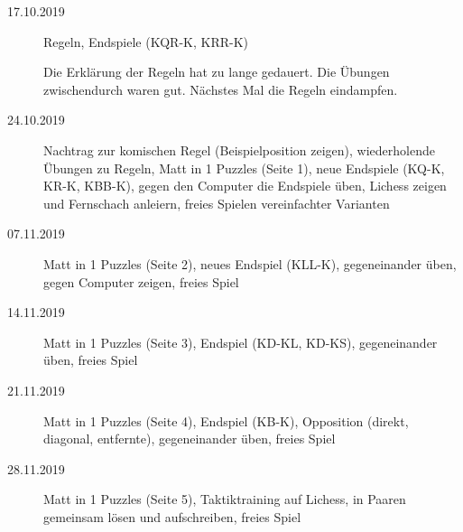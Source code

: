 \documentclass[
  a4paper,
  justified,
  nobib,
]{tufte-handout}
\begin{document}
\begin{description}
  \item[17.10.2019] Regeln, Endspiele (KQR-K, KRR-K)

    Die Erklärung der Regeln hat zu lange gedauert.
    Die Übungen zwischendurch waren gut.
    Nächstes Mal die Regeln eindampfen.

  \item[24.10.2019] Nachtrag zur komischen Regel (Beispielposition zeigen),
    wiederholende Übungen zu Regeln,
    Matt in 1 Puzzles (Seite 1),
    neue Endspiele (KQ-K, KR-K, KBB-K),
    gegen den Computer die Endspiele üben,
    Lichess zeigen und Fernschach anleiern,
    freies Spielen vereinfachter Varianten

  \item[07.11.2019] Matt in 1 Puzzles (Seite 2),
    neues Endspiel (KLL-K),
    gegeneinander üben,
    gegen Computer zeigen,
    freies Spiel

  \item[14.11.2019] Matt in 1 Puzzles (Seite 3),
    Endspiel (KD-KL, KD-KS),
    gegeneinander üben,
    freies Spiel

  \item[21.11.2019] Matt in 1 Puzzles (Seite 4),
    Endspiel (KB-K),
    Opposition (direkt, diagonal, entfernte),
    gegeneinander üben,
    freies Spiel

  \item[28.11.2019] Matt in 1 Puzzles (Seite 5),
    Taktiktraining auf Lichess,
    in Paaren gemeinsam lösen und aufschreiben,
    freies Spiel
\end{description}
\end{document}
